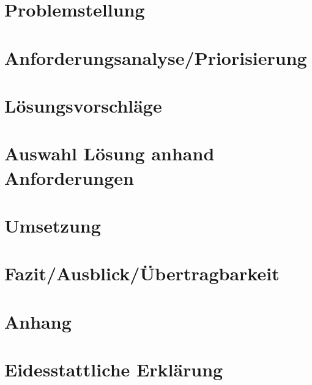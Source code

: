 \documentclass[a4paper,11pt,singlespacing]{article}
\begin{document}
	

\section{Problemstellung}\label{sec:Problemstellung}



\section{Anforderungsanalyse/Priorisierung}\label{sec:AnforderungsanalysePriorisierung}



\section{Lösungsvorschläge}\label{sec:Lösungsvorschläge}



\section{Auswahl Lösung anhand Anforderungen}\label{sec:AuswahlLösungAnhandAnforderungen}



\section{Umsetzung}\label{sec:Umsetzung}



\section{Fazit/Ausblick/Übertragbarkeit}\label{sec:Fazit/Ausblick/Übertragbarkeit}



\newpage



\listoffigures
{}

\lstlistoflistings
{}


\newpage
\section*{Anhang}\label{Anhang}



\newpage
\section*{Eidesstattliche Erklärung}\label{sec:Eidesstattliche Erklärung}
\end{document}
